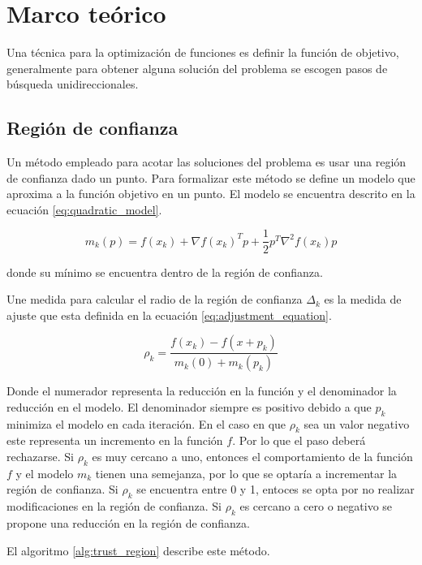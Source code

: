 \section{Marco teórico}

Una técnica para la optimización de funciones es definir la función de objetivo, generalmente para obtener alguna solución del problema se escogen pasos de búsqueda unidireccionales.

\subsection{Región de confianza \label{sec:trust_region}}

Un método empleado para acotar las soluciones del problema es usar una región de confianza dado un punto. Para formalizar este método se define un modelo que aproxima a la función objetivo en un punto. El modelo se encuentra descrito en la ecuación \ref{eq:quadratic_model}.

\begin{equation}
    m_k (p) = f(x_k) + \nabla f(x_k)^T p + \frac{1}{2} p^T \nabla^2 f(x_k) p
    \label{eq:quadratic_model}
\end{equation}

donde su mínimo se encuentra dentro de la región de confianza.

Une medida para calcular el radio de la región de confianza  $\Delta_k$ es la medida de ajuste que esta definida en la ecuación \ref{eq:adjustment_equation}.

\begin{equation*}
    \rho_k = \frac{f(x_k)-f(x+p_k)}{m_k(0)+m_k(p_k)}  \label{eq:adjustment_equation}
\end{equation*}

Donde el numerador representa la reducción en la función y el denominador la reducción en el modelo. El denominador siempre es positivo debido a que $p_k$ minimiza el modelo en cada iteración. En el caso en que $\rho_k$ sea un valor negativo este representa un incremento en la función $f$. Por lo que el paso deberá rechazarse. Si $\rho_k$ es muy cercano a uno, entonces el comportamiento de la función $f$ y el modelo $m_k$ tienen una semejanza, por lo que se optaría a incrementar la región de confianza. Si $\rho_k$ se encuentra entre 0 y 1, entoces se opta por no realizar modificaciones en la región de confianza. Si $\rho_k$ es cercano a cero o negativo se propone una reducción en la región de confianza.

El algoritmo \ref{alg:trust_region} describe este método.

